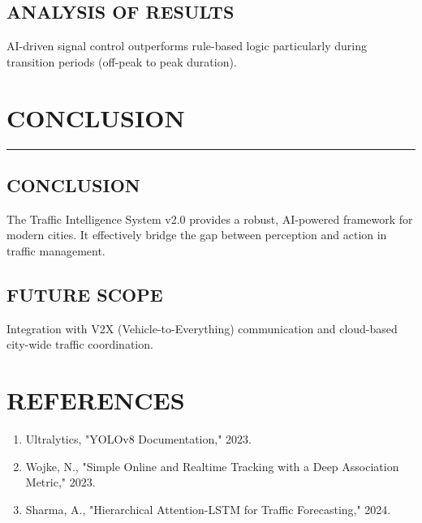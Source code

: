 \documentclass[12pt,times,a4paper]{report}
\newcommand\HRule{\rule{\textwidth}{1pt}}
\begin{document}
\section{ANALYSIS OF RESULTS}
AI-driven signal control outperforms rule-based logic particularly during transition periods (off-peak to peak duration).

\chapter{CONCLUSION}
\HRule
\section{CONCLUSION}
The Traffic Intelligence System v2.0 provides a robust, AI-powered framework for modern cities. It effectively bridge the gap between perception and action in traffic management.
\section{FUTURE SCOPE}
Integration with V2X (Vehicle-to-Everything) communication and cloud-based city-wide traffic coordination.

\chapter{REFERENCES}
\begin{enumerate}
    \item Ultralytics, "YOLOv8 Documentation," 2023.
    \item Wojke, N., "Simple Online and Realtime Tracking with a Deep Association Metric," 2023.
    \item Sharma, A., "Hierarchical Attention-LSTM for Traffic Forecasting," 2024.
\end{enumerate}
\end{document}
